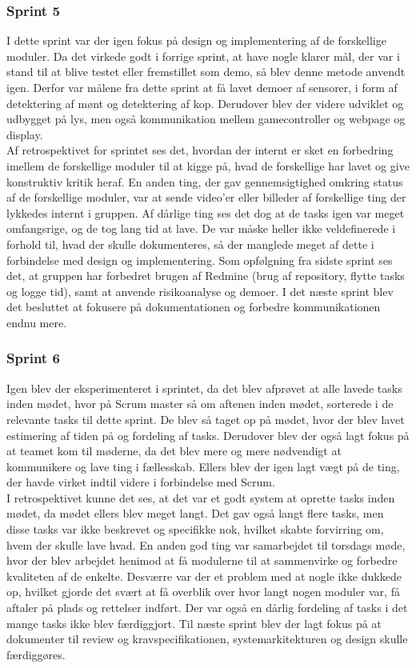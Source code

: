 \documentclass[a4paper,12pt,fleqn,oneside]{article}
\begin{document}
\subsubsection{Sprint 5}
I dette sprint var der igen fokus på design og implementering af de forskellige moduler. Da det virkede godt i forrige sprint, at have nogle klarer mål, der var i stand til at blive testet eller fremstillet som demo, så blev denne metode anvendt igen. Derfor var målene fra dette sprint at få lavet demoer af sensorer, i form af detektering af mønt og detektering af kop. Derudover blev der videre udviklet og udbygget på lys, men også kommunikation mellem gamecontroller og webpage og display.
\\Af retrospektivet for sprintet ses det, hvordan der internt er sket en forbedring imellem de forskellige moduler til at kigge på, hvad de forskellige har lavet og give konstruktiv kritik heraf. En anden ting, der gav gennemsigtighed omkring status af de forskellige moduler, var at sende video'er eller billeder af forskellige ting der lykkedes internt i gruppen. Af dårlige ting ses det dog at de tasks igen var meget omfangsrige, og de tog lang tid at lave. De var måske heller ikke veldefinerede i forhold til, hvad der skulle dokumenteres, så der manglede meget af dette i forbindelse med design og implementering. Som opfølgning fra sidste sprint ses det, at gruppen har forbedret brugen af Redmine (brug af repository, flytte tasks og logge tid), samt at anvende risikoanalyse og demoer. I det næste sprint blev det besluttet at fokusere på dokumentationen og forbedre kommunikationen endnu mere.

\subsubsection{Sprint 6}
Igen blev der eksperimenteret i sprintet, da det blev afprøvet at alle lavede tasks inden mødet, hvor på Scrum master så om aftenen inden mødet, sorterede i de  relevante tasks til dette sprint. De blev så taget op på mødet, hvor der blev lavet estimering af tiden på og fordeling af tasks. Derudover blev der også lagt fokus på at teamet kom til møderne, da det blev mere og mere nødvendigt at kommunikere og lave ting i fællesskab. Ellers blev der igen lagt vægt på de ting, der havde virket indtil videre i forbindelse med Scrum.
\\I retrospektivet kunne det ses, at det var et godt system at oprette tasks inden mødet, da mødet ellers blev meget langt. Det gav også langt flere tasks, men disse tasks var ikke beskrevet og specifikke nok, hvilket skabte forvirring om, hvem der skulle lave hvad. En anden god ting var samarbejdet til torsdags møde, hvor der blev arbejdet henimod at få modulerne til at sammenvirke og forbedre kvaliteten af de enkelte. Desværre var der et problem med at nogle ikke dukkede op, hvilket gjorde det svært at få overblik over hvor langt nogen moduler var, få aftaler på plads og rettelser indført. Der var også en dårlig fordeling af tasks i det mange tasks ikke blev færdiggjort. Til næste sprint blev der lagt fokus på at dokumenter til review og kravspecifikationen, systemarkitekturen og design skulle færdiggøres. 
\end{document}
